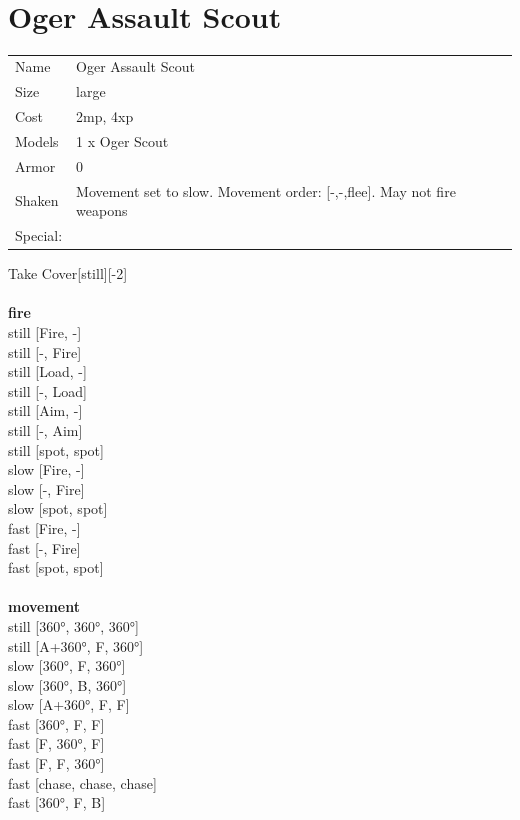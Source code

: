  
\ \\













\clearpage

\section{ Oger Assault Scout }

\begin{tabular}{ll}
  Name & Oger Assault Scout \\
  Size & large\\
  Cost & 2mp, 4xp\\
  Models & 1 x Oger Scout\\
  Armor & 0\\
  Shaken & Movement set to slow. Movement order: [-,-,flee]. May not fire weapons\\
  Special: \\
\end{tabular}

\noindent Take Cover[still][-2]\\ 


\ \\ {\bf fire } \\
still [Fire, -] \\
still [-, Fire] \\
still [Load, -] \\
still [-, Load] \\
still [Aim, -] \\
still [-, Aim] \\
still [spot, spot] \\
slow [Fire, -] \\
slow [-, Fire] \\
slow [spot, spot] \\
fast [Fire, -] \\
fast [-, Fire] \\
fast [spot, spot] \\
\ \\ {\bf movement } \\
still [360°, 360°, 360°] \\
still [A+360°, F, 360°] \\
slow [360°, F, 360°] \\
slow [360°, B, 360°] \\
slow [A+360°, F, F] \\
fast [360°, F, F] \\
fast [F, 360°, F] \\
fast [F, F, 360°] \\
fast [chase, chase, chase] \\
fast [360°, F, B] \\


